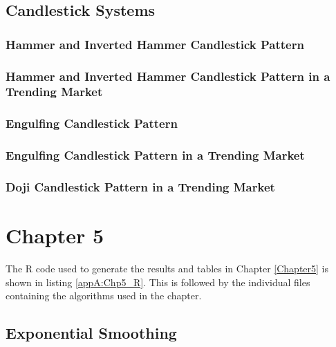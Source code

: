 \subsection{Candlestick Systems}
\subsubsection{Hammer and Inverted Hammer Candlestick Pattern}
\label{appA:Hammer}


\subsubsection{Hammer and Inverted Hammer Candlestick Pattern in a Trending Market}
\label{appA:Hammer_aroon}



\subsubsection{Engulfing Candlestick Pattern}
\label{appA:Engulf}


\subsubsection{Engulfing Candlestick Pattern in a Trending Market}
\label{appA:Engulf_aroon}


\subsubsection{Doji Candlestick Pattern in a Trending Market}
\label{appA:Doji_aroon}


\section{Chapter 5}
The R code used to generate the results and tables in Chapter \ref{Chapter5} is shown in listing \ref{appA:Chp5_R}. This is followed by the individual files containing the algorithms used in the chapter.

\label{appA:Chp5_R}


\subsection{Exponential Smoothing}
\label{appA:es_1}


